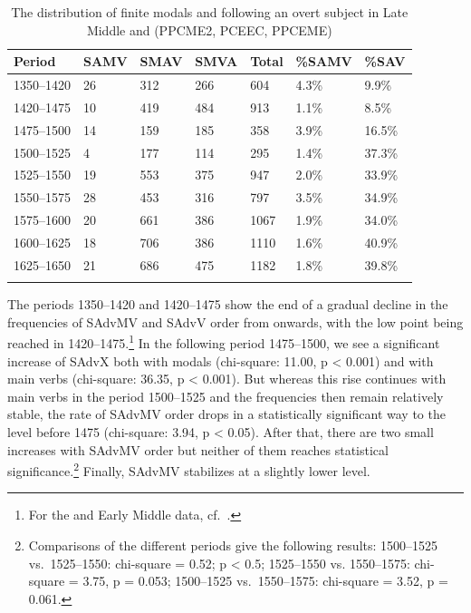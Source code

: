 \documentclass[output=paper]{langsci/langscibook}
\begin{document}
\begin{table}
\caption{The distribution of finite modals and  following an overt
    subject in Late Middle and  (PPCME2, PCEEC,
PPCEME)}\label{tab:key:09.1}
\label{tab:1}
\begin{tabularx}{\textwidth}{lXXXXXX}
\lsptoprule
\textbf{Period} & \textbf{SAMV} & \textbf{SMAV} & \textbf{SMVA} & \textbf{Total} & \textbf{\%SAMV} & \textbf{\%SAV}\\
\midrule
1350--1420 & 26 & 312 & 266 & 604 & 4.3\% & 9.9\%\\
1420--1475 & 10 & 419 & 484 & 913 & 1.1\% & 8.5\%\\
1475--1500 & 14 & 159 & 185 & 358 & 3.9\% & 16.5\%\\
1500--1525 & 4 & 177 & 114 & 295 & 1.4\% & 37.3\%\\
1525--1550 & 19 & 553 & 375 & 947 & 2.0\% & 33.9\%\\
1550--1575 & 28 & 453 & 316 & 797 & 3.5\% & 34.9\%\\
1575--1600 & 20 & 661 & 386 & 1067 & 1.9\% & 34.0\%\\
1600--1625 & 18 & 706 & 386 & 1110 & 1.6\% & 40.9\%\\
1625--1650 & 21 & 686 & 475 & 1182 & 1.8\% & 39.8\%\\
\lspbottomrule
\end{tabularx}
\end{table}

The periods 1350--1420 and 1420--1475 show the end of a gradual decline in the
frequencies of SAdvMV and SAdvV order from  onwards, with the low
point being reached in 1420--1475.\footnote{For the  and Early
Middle  data, cf.\ \textcites[512]{HaeIhs2016}{HaeIhsta}.}  In the
following period 1475--1500, we see a significant increase of SAdvX both with
modals (chi-square: 11.00, p < 0.001) and with main verbs (chi-square: 36.35, p
< 0.001). But whereas this rise continues with main verbs in the period
1500--1525 and the frequencies then remain relatively stable, the rate of SAdvMV
order drops in a statistically significant way to the level before 1475
(chi-square: 3.94, p < 0.05). After that, there are two small increases with
SAdvMV order but neither of them reaches statistical
significance.\footnote{Comparisons of the different periods give the following
    results: 1500--1525 vs.\ 1525--1550: chi-square = 0.52; p < 0.5; 1525--1550 vs.
    1550--1575: chi-square = 3.75, p = 0.053; 1500--1525 vs.\  1550--1575:
chi-square = 3.52, p = 0.061.} Finally, SAdvMV stabilizes at a slightly lower
level.
\end{document}
